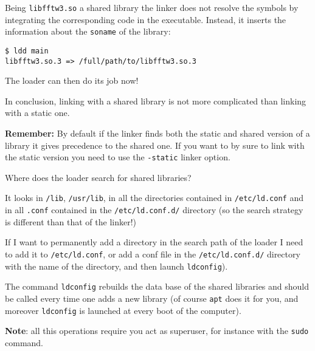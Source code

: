 \documentclass[10pt,aspectratio=169]{beamer}
\begin{document}
\begin{frame}[fragile]

  Being \texttt{libfftw3.so} a shared library the linker does not
  resolve the symbols by integrating the corresponding code in the
  executable. Instead, it inserts the information about the
  \texttt{soname} of the library:
  \smallskip

\begin{verbatim}
$ ldd main
libfftw3.so.3 => /full/path/to/libfftw3.so.3
\end{verbatim}
\smallskip
The loader can then do its job now!
\smallskip

In conclusion, linking with a shared library is not more complicated
than linking with a static one.
\medskip

\textbf{Remember:} By default if the linker finds both the static and
shared version of a library it gives precedence to the shared
one. If you want to by sure to link with the static version you need to use 
the \texttt{-static} linker option.
\end{frame}

\begin{frame}{Where does the loader search for shared libraries?}  

  It looks in \texttt{/lib}, \texttt{/usr/lib}, in all the
  directories contained in \texttt{/etc/ld.conf} and in all \texttt{.conf} contained in the \texttt{/etc/ld.conf.d/}
  directory (so the search strategy is different than that of the
  linker!) \smallskip

  If I want to permanently add a directory in the search path of the
  loader I need to add it to \texttt{/etc/ld.conf}, or add a conf file
  in the \texttt{/etc/ld.conf.d/} directory with the name of the
  directory, and then launch \texttt{ldconfig}).  \smallskip

  The command \texttt{ldconfig} rebuilds the data base of the shared
  libraries and should be called every time one adds a new library (of
  course \texttt{apt} does it for you, and moreover
  \texttt{ldconfig} is launched at every boot of the computer).
  \smallskip

  \textbf{Note}: all this operations require you act as superuser, for
  instance with the \texttt{sudo} command.
\end{frame}
\end{document}
